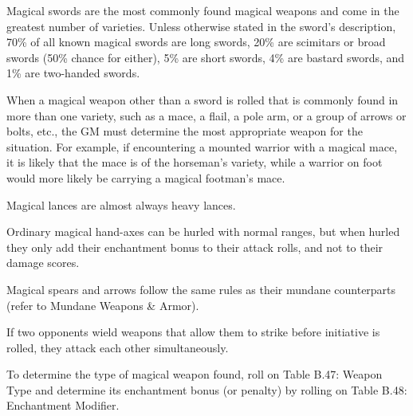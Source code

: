 \begin{multicols}{2}
Magical swords are the most commonly found magical weapons and come in the greatest number of varieties.  Unless otherwise stated in the sword's description, 70\% of all known magical swords are long swords, 20\% are scimitars or broad swords (50\% chance for either), 5\% are short swords, 4\% are bastard swords, and 1\% are two-handed swords.  

When a magical weapon other than a sword is rolled that is commonly found in more than one variety, such as a mace, a flail, a pole arm, or a group of arrows or bolts, etc., the GM must determine the most appropriate weapon for the situation.  For example, if encountering a mounted warrior with a magical mace, it is likely that the mace is of the horseman's variety, while a warrior on foot would more likely be carrying a magical footman's mace.

Magical lances are almost always heavy lances.  
 
Ordinary magical hand-axes can be hurled with normal ranges, but when hurled they only add their enchantment bonus to their attack rolls, and not to their damage scores.  

Magical spears and arrows follow the same rules as their mundane counterparts (refer to Mundane Weapons \& Armor).

If two opponents wield weapons that allow them to strike before initiative is rolled, they attack each other simultaneously.

To determine the type of magical weapon found, roll on Table B.47: Weapon Type and determine its enchantment bonus (or penalty) by rolling on Table B.48: Enchantment Modifier.

\noindent \begin{minipage}{\columnwidth}


\end{minipage}
\end{multicols}
